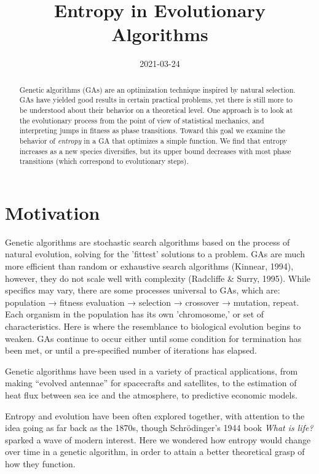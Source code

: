 \documentclass[11pt]{article}
\date{2021-03-24}
\title{Entropy in Evolutionary Algorithms}
\begin{document}
\maketitle

\label{sec:org26f53e0}
\begin{abstract}

Genetic algorithms (GAs) are an optimization technique inspired by
natural selection. GAs have yielded good results in certain practical
problems, yet there is still more to be understood about their
behavior on a theoretical level. One approach is to look at the
evolutionary process from the point of view of statistical mechanics,
and interpreting jumps in fitness as phase transitions. Toward this
goal we examine the behavior of \emph{entropy} in a GA that optimizes
a simple function.  We find that entropy increases as a new species
diversifies, but its upper bound decreases with most phase
transitions (which correspond to evolutionary steps).
\end{abstract}


\section{Motivation}

Genetic algorithms are stochastic search algorithms based on the
process of natural evolution, solving for the 'fittest' solutions to a
problem. GAs are much more efficient than random or exhaustive search
algorithms (Kinnear, 1994), however, they do not scale well with
complexity (Radcliffe \& Surry, 1995). While specifics may vary, there
are some processes universal to GAs, which are: population → fitness
evaluation → selection → crossover → mutation, repeat. Each organism
in the population has its own 'chromosome,' or set of
characteristics. Here is where the resemblance to biological evolution
begins to weaken. GAs continue to occur either until some condition
for termination has been met, or until a pre-specified number of
iterations has elapsed.

Genetic algorithms have been used in a variety of practical
applications, from making ``evolved antennae'' for spacecrafts and
satellites, to the estimation of heat flux between sea ice and the
atmosphere, to predictive economic models.

Entropy and evolution have been often explored together, with
attention to the idea going as far back as the 1870s, though
Schrödinger's 1944 book \emph{What is life?} sparked a wave of modern
interest. Here we wondered how entropy would change over time in a
genetic algorithm, in order to attain a better theoretical grasp of
how they function.
\end{document}
